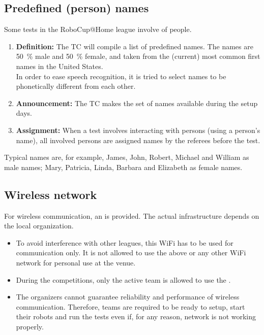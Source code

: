 \subsection{Predefined (person) names}\label{rule:scenario_names}

Some tests in the RoboCup@Home league involve  of people. 

\begin{enumerate}
	\item \textbf{Definition:} The TC will compile a list of \NumNames predefined names. The names are \SI{50}{\percent} male and \SI{50}{\percent} female, and taken from the (current) most common first names in the United States.\\
	In order to ease speech recognition, it is tried to select names to be phonetically different from each other.

	\item \textbf{Announcement:} The TC makes the set of names available during the setup days.
	\item \textbf{Assignment:} When a test involves interacting with persons (using a person's name), all involved persons are assigned names by the referees before the test. 
\end{enumerate}

Typical names are, for example, James, John, Robert, Michael and William as male names; Mary, Patricia, Linda, Barbara and Elizabeth as female names.


\subsection{Wireless network}
\label{rule:scenario_wifi}

For wireless communication, an  is provided. The actual infrastructure depends on the local organization. 

\begin{itemize}
	\item To avoid interference with other leagues, this WiFi has to be used for communication only. It is not allowed to use the above or any other WiFi network for personal use at the venue.
	\item During the competitions, only the active team is allowed to use the . 
	\item The organizers cannot guarantee reliability and performance of wireless communication. Therefore, teams are required to be ready to setup, start their robots and run the tests even if, for any reason, network is not working properly.
\end{itemize}

